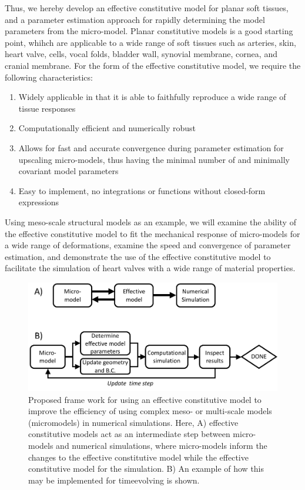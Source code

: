     
    Thus, we hereby develop an effective constitutive model for planar soft tissues, and a parameter estimation approach for rapidly determining the model parameters from the micro-model. Planar constitutive models is a good starting point, whihch are applicable to a wide range of soft tissues such as arteries, skin, heart valve, cells, vocal folds, bladder wall, synovial membrane, cornea, and cranial membrane. For the form of the effective constitutive model, we require the following characteristics:
\begin{enumerate}
    \item Widely applicable in that it is able to faithfully reproduce a wide range of tissue responses
    \item Computationally efficient and numerically robust
    \item Allows for fast and accurate convergence during parameter estimation for upscaling micro-models, thus having the minimal number of and minimally covariant model parameters
    \item Easy to implement, no integrations or functions without closed-form expressions
\end{enumerate}
    Using meso-scale structural models as an example, we will examine the ability of the effective constitutive model to fit the mechanical response of micro-models for a wide range of deformations, examine the speed and convergence of parameter estimation, and demonstrate the use of the effective constitutive model to facilitate the simulation of heart valves with a wide range of material properties.
    
\begin{figure}
\centering
\includegraphics[width=\textwidth]{Images/chapter5/simulationframework}
\caption{Proposed frame work for using an effective constitutive model to improve the efficiency of using complex meso- or multi-scale models (micro\Hyphdash models) in numerical simulations. Here, A) effective constitutive models act as an intermediate step between micro-models and numerical simulations, where micro-models inform the changes to the effective constitutive model while the effective constitutive model for the simulation. B) An example of how this may be implemented for time\Hyphdash evolving is shown.}
\label{fig:simulationframework}
\end{figure}
    
    
    
    
    
    
    
    
